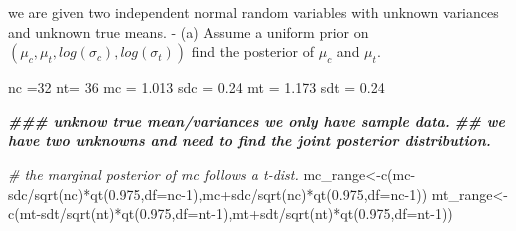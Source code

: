 \documentclass[
]{book}
\newenvironment{Shaded}{\begin{snugshade}}{\end{snugshade}}
\newcommand{\AttributeTok}[1]{\textcolor[rgb]{0.77,0.63,0.00}{#1}}
\newcommand{\CommentTok}[1]{\textcolor[rgb]{0.56,0.35,0.01}{\textit{#1}}}
\newcommand{\DecValTok}[1]{\textcolor[rgb]{0.00,0.00,0.81}{#1}}
\newcommand{\DocumentationTok}[1]{\textcolor[rgb]{0.56,0.35,0.01}{\textbf{\textit{#1}}}}
\newcommand{\FloatTok}[1]{\textcolor[rgb]{0.00,0.00,0.81}{#1}}
\newcommand{\FunctionTok}[1]{\textcolor[rgb]{0.00,0.00,0.00}{#1}}
\newcommand{\NormalTok}[1]{#1}
\newcommand{\OtherTok}[1]{\textcolor[rgb]{0.56,0.35,0.01}{#1}}
\newcommand{\SpecialCharTok}[1]{\textcolor[rgb]{0.00,0.00,0.00}{#1}}
\theoremstyle{definition}
\theoremstyle{definition}
\theoremstyle{definition}
\theoremstyle{definition}
\theoremstyle{remark}
\begin{document}
we are given two independent normal random variables with unknown variances and unknown true means.
- (a) Assume a uniform prior on \((\mu_c, \mu_t, log(\sigma_c),log(\sigma_t))\) find the posterior of \(\mu_c\) and \(\mu_t\).

\begin{Shaded}
\begin{Highlighting}[]
\NormalTok{ nc }\OtherTok{=}\DecValTok{32}
\NormalTok{ nt}\OtherTok{=} \DecValTok{36}
\NormalTok{ mc }\OtherTok{=} \FloatTok{1.013}
\NormalTok{ sdc }\OtherTok{=} \FloatTok{0.24}
\NormalTok{ mt }\OtherTok{=} \FloatTok{1.173}
\NormalTok{ sdt }\OtherTok{=} \FloatTok{0.24}
 
 \DocumentationTok{\#\#\# unknow true mean/variances  we only have sample data.}
 \DocumentationTok{\#\# we have two unknowns and need to find the joint posterior distribution.}
 
 \CommentTok{\# the marginal posterior of mc follows a t{-}dist.}
\NormalTok{  mc\_range}\OtherTok{\textless{}{-}}\FunctionTok{c}\NormalTok{(mc}\SpecialCharTok{{-}}\NormalTok{sdc}\SpecialCharTok{/}\FunctionTok{sqrt}\NormalTok{(nc)}\SpecialCharTok{*}\FunctionTok{qt}\NormalTok{(}\FloatTok{0.975}\NormalTok{,}\AttributeTok{df=}\NormalTok{nc}\DecValTok{{-}1}\NormalTok{),mc}\SpecialCharTok{+}\NormalTok{sdc}\SpecialCharTok{/}\FunctionTok{sqrt}\NormalTok{(nc)}\SpecialCharTok{*}\FunctionTok{qt}\NormalTok{(}\FloatTok{0.975}\NormalTok{,}\AttributeTok{df=}\NormalTok{nc}\DecValTok{{-}1}\NormalTok{))}
\NormalTok{   mt\_range}\OtherTok{\textless{}{-}}\FunctionTok{c}\NormalTok{(mt}\SpecialCharTok{{-}}\NormalTok{sdt}\SpecialCharTok{/}\FunctionTok{sqrt}\NormalTok{(nt)}\SpecialCharTok{*}\FunctionTok{qt}\NormalTok{(}\FloatTok{0.975}\NormalTok{,}\AttributeTok{df=}\NormalTok{nt}\DecValTok{{-}1}\NormalTok{),mt}\SpecialCharTok{+}\NormalTok{sdt}\SpecialCharTok{/}\FunctionTok{sqrt}\NormalTok{(nt)}\SpecialCharTok{*}\FunctionTok{qt}\NormalTok{(}\FloatTok{0.975}\NormalTok{,}\AttributeTok{df=}\NormalTok{nt}\DecValTok{{-}1}\NormalTok{))}


\end{Highlighting}
\end{Shaded}
\end{document}
